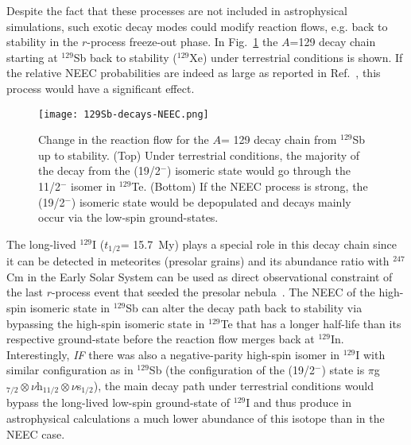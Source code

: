 \documentclass[12pt]{article}
\begin{document}
Despite the fact that these processes are not included in astrophysical simulations, such exotic decay modes could modify reaction flows, e.g. back to stability in the $r$-process freeze-out phase. In Fig.~\ref{A129-decay} the $A$=129 decay chain starting at $^{129}$Sb back to stability ($^{129}$Xe) under terrestrial conditions is shown.  If the relative NEEC probabilities are indeed as large as reported in Ref.~\cite{Chi18}, this process would have a significant effect.

\begin{figure}[!htb]
  \centering
  \texttt{[image: 129Sb-decays-NEEC.png]}
  \caption{\label{A129-decay}\small{Change in the reaction flow for the $A$= 129 decay chain from $^{129}$Sb up to stability. (Top) Under terrestrial conditions, the majority of the decay from the (19/2$^-$) isomeric state would go through the 11/2$^-$ isomer in $^{129}$Te. (Bottom) If the NEEC process is strong, the (19/2$^-$) isomeric state would be depopulated and decays mainly occur via the low-spin ground-states.} }
\end{figure}

The long-lived $^{129}$I ($t_{1/2}$= 15.7~My) plays a special role in this decay chain since it can be detected in meteorites (presolar grains) and its abundance ratio with $^{247}$Cm in the Early Solar System can be used as direct observational constraint of the last $r$-process event that seeded the presolar nebula~\cite{Ben21}.
The NEEC of the high-spin isomeric state in $^{129}$Sb can alter the decay path back to stability via bypassing the high-spin isomeric state in $^{129}$Te that has a longer half-life than its respective ground-state before the reaction flow merges back at $^{129}$In. Interestingly, \textit{IF} there was also a negative-parity high-spin isomer in $^{129}$I with similar configuration as in $^{129}$Sb (the configuration of the (19/2$^-$) state is $\pi$g$_{7/2}\otimes\nu$h$_{11/2}\otimes\nu$s$_{1/2}$), the main decay path under terrestrial conditions would bypass the long-lived low-spin ground-state of $^{129}$I and thus produce in astrophysical calculations a much lower abundance of this isotope than in the NEEC case.

\end{document}
